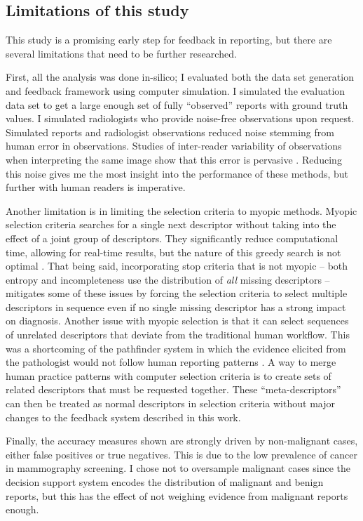 \subsection{Limitations of this study}
This study is a promising early step for feedback in reporting, but there are several limitations that need to be further researched.

First, all the analysis was done in-silico; I evaluated both the data set generation and feedback framework using computer simulation.
I simulated the evaluation data set to get a large enough set of fully ``observed'' reports with ground truth values.
I simulated radiologists who provide noise-free observations upon request.
Simulated reports and radiologist observations reduced noise stemming from human error in observations.
Studies of inter-reader variability of observations when interpreting the same image show that this error is pervasive \cite{Boyer:2012gk}.
Reducing this noise gives me the most insight into the performance of these methods, but further with human readers is imperative.

Another limitation is in limiting the selection criteria to myopic methods.
Myopic selection criteria searches for a single next descriptor without taking into the effect of a joint group of descriptors.
They significantly reduce computational time, allowing for real-time results, but the nature of this greedy search is not optimal \cite{Nemhauser:1978ck}.
That being said, incorporating stop criteria that is not myopic -- both entropy and incompleteness use the distribution of \emph{all} missing descriptors -- mitigates some of these issues by forcing the selection criteria to select multiple descriptors in sequence even if no single missing descriptor has a strong impact on diagnosis.
Another issue with myopic selection is that it can select sequences of unrelated descriptors that deviate from the traditional human workflow.
This was a shortcoming of the pathfinder system in which the evidence elicited from the pathologist would not follow human reporting patterns \cite{Heckerman:1992ud}.
A way to merge human practice patterns with computer selection criteria is to create sets of related descriptors that must be requested together.
These ``meta-descriptors'' can then be treated as normal descriptors in selection criteria without major changes to the feedback system described in this work.

Finally, the accuracy measures shown are strongly driven by non-malignant cases, either false positives or true negatives.
This is due to the low prevalence of cancer in mammography screening.
I chose not to oversample malignant cases since the decision support system encodes the distribution of malignant and benign reports, but this has the effect of not weighing evidence from malignant reports enough.


